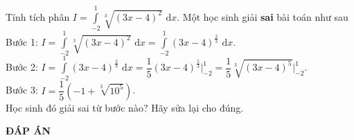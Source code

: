 \begin{bt}%
Tính tích phân $I=\displaystyle\int\limits_{-2}^{1}  \sqrt[3]{(3x-4)^2}\,\mathrm{\,d}x$. Một học sinh giải \textbf{sai} bài toán như sau\\
Bước 1: $I=\displaystyle\int\limits_{-2}^{1}  \sqrt[3]{(3x-4)^2}\,\mathrm{\,d}x=\displaystyle\int\limits_{-2}^{1}  (3x-4)^{\frac{2}{3}}\,\mathrm{\,d}x$.\\
Bước 2: $I=\displaystyle\int\limits_{-2}^{1}  (3x-4)^{\frac{2}{3}}\,\mathrm{\,d}x= \dfrac{1}{5}(3x-4)^{\frac{5}{3}}\bigg|_{-2}^{1}=\dfrac{1}{5}\sqrt[3]{(3x-4)^5}\bigg|_{-2}^{1}$.\\
Bước 3: $I=\dfrac{1}{5}\left(-1+\sqrt[3]{10^5} \right) $.\\
Học sinh đó giải sai từ bước nào? Hãy sửa lại cho đúng.

\end{bt}


\newpage
\begin{center}
	\textbf{ĐÁP ÁN}
\end{center}
\begin{multicols}{10}
	
\end{multicols}
